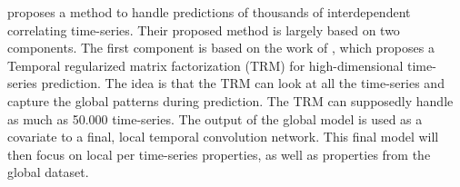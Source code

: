 \cite{Sen2019} proposes a method to handle predictions of thousands of interdependent correlating time-series.
Their proposed method is largely based on two components. The first component is based on the work of
\cite{Yu}, which proposes a Temporal regularized matrix factorization (TRM) for high-dimensional time-series prediction.
The idea is that the TRM can look at all the time-series and capture the global patterns during prediction.
The TRM can supposedly handle as much as 50.000 time-series.
The output of the global model is used as a covariate to a final, local temporal convolution network. This final model
will then focus on local per time-series properties, as well as properties from the global dataset.





%
